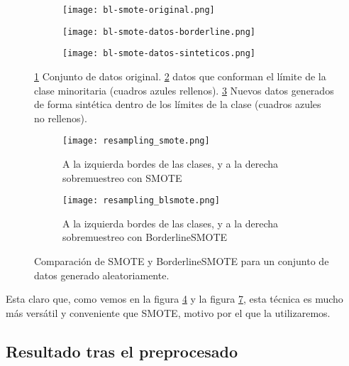 \begin{figure}[H]
    \centering
    \begin{subfigure}[b]{0.33\textwidth}
		  \texttt{[image: bl-smote-original.png]}
        \caption{}
        \label{fig:blSMOTE-orig}
    \end{subfigure}
    \begin{subfigure}[b]{0.33\textwidth}
        \texttt{[image: bl-smote-datos-borderline.png]}
        \caption{}
        \label{fig:blSMOTE-border}
    \end{subfigure}
    \begin{subfigure}[b]{0.33\textwidth}
        \texttt{[image: bl-smote-datos-sinteticos.png]}
        \caption{}
        \label{fig:blSMOTE-sintetico}
    \end{subfigure}

    \caption{\ref{fig:blSMOTE-orig} Conjunto de datos original. \ref{fig:blSMOTE-border} datos que conforman el límite de la clase minoritaria (cuadros azules rellenos). \ref{fig:blSMOTE-sintetico} Nuevos datos generados de forma sintética dentro de los límites de la clase (cuadros azules no rellenos).}\label{fig:ejemploBL-SMOTE}

\end{figure}


\begin{figure}[H]
    \centering
	 \begin{subfigure}[b]{\textwidth}
		 \centering
		 \texttt{[image: resampling\_smote.png]}
		 \caption{A la izquierda bordes de las clases, y a la derecha sobremuestreo con SMOTE}
		 \label{fig:SMOTE-cmp}
	 \end{subfigure}

    \begin{subfigure}[b]{\textwidth}
		 \centering
		  \texttt{[image: resampling\_blsmote.png]}
        \caption{A la izquierda bordes de las clases, y a la derecha sobremuestreo con BorderlineSMOTE}
        \label{fig:BLSMOTE-cmp}
    \end{subfigure}

    \caption{Comparación de SMOTE y BorderlineSMOTE para un conjunto de datos generado aleatoriamente.}\label{fig:BLSMOTE-SMOTE}

\end{figure}


Esta claro que, como vemos en la figura \ref{fig:ejemploBL-SMOTE} y la figura \ref{fig:BLSMOTE-SMOTE}, esta técnica es mucho más versátil y conveniente que SMOTE, motivo por el que la utilizaremos.


\subsection{Resultado tras el preprocesado}
